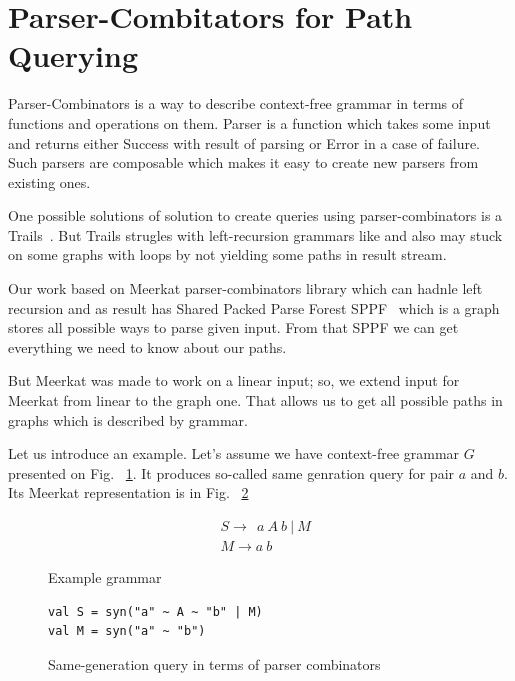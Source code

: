 \section{Parser-Combitators for Path Querying}

Parser-Combinators is a way to describe context-free grammar in terms of functions and operations on them. Parser is a function which takes some input and returns either Success with result of parsing or Error in a case of failure. Such parsers are composable which makes it easy to create new parsers from existing ones.

One possible solutions of solution to create queries using parser-combinators is a Trails~\cite{ScalaGraphParsing}. But Trails strugles with left-recursion grammars like and also may stuck on some graphs with loops by not yielding some paths in result stream.

Our work based on Meerkat parser-combinators library which can hadnle left recursion and as result has Shared Packed Parse Forest SPPF~\cite{SPPF} which is a graph stores all possible ways to parse given input. From that SPPF we can get everything we need to know about our paths.

But Meerkat was made to work on a linear input; so, we extend input for Meerkat from linear to the graph one. That allows us to get all possible paths in graphs which is described by grammar.

Let us introduce an example. Let's assume we have context-free grammar $G$ presented on Fig. ~\ref{fig:exampleGrammar}. It produces so-called same genration query for pair $a$ and $b$. Its Meerkat representation is in Fig. ~\ref{fig:exampleGrammarMeerkat}

\begin{figure}[h]
\begin{align*}
& S \rightarrow\ \ a\ A\ b\ |\ M \\
& M \rightarrow a\ b
\end{align*}
\caption{Example grammar}
\label{fig:exampleGrammar}
\end{figure}


\begin{figure}[h]
\begin{lstlisting}
val S = syn("a" ~ A ~ "b" | M)
val M = syn("a" ~ "b") 
\end{lstlisting}
\caption{Same-generation query in terms of parser combinators}
\label{fig:exampleGrammarMeerkat}
\end{figure}

